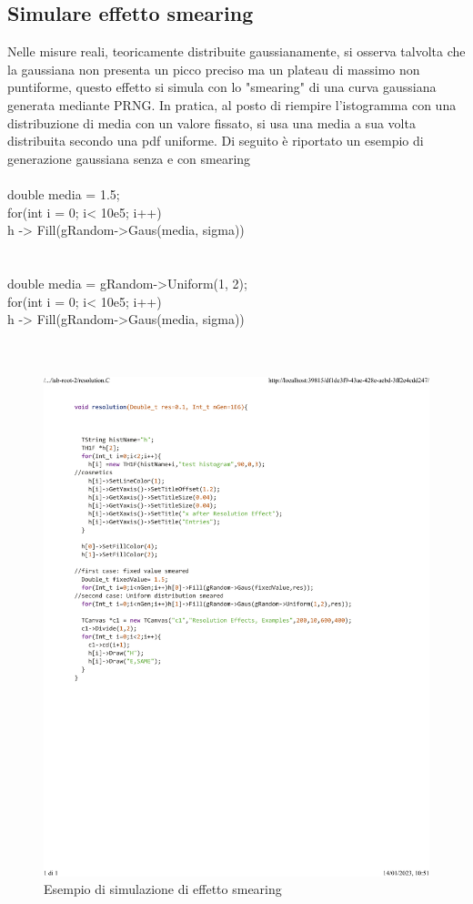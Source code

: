 \documentclass[10pt,a4paper]{article}
\begin{document}
\subsection{Simulare effetto smearing}
Nelle misure reali, teoricamente distribuite gaussianamente, si osserva talvolta che la gaussiana non presenta un picco preciso ma un plateau di massimo non puntiforme, questo effetto si simula con lo "smearing" di una curva gaussiana generata mediante PRNG. In pratica, al posto di riempire l'istogramma con una distribuzione di media con un valore fissato, si usa una media a sua volta distribuita secondo una pdf uniforme. Di seguito è riportato un esempio di generazione gaussiana senza e con smearing\\\\
double media = 1.5;\\
for(int i = 0; i< 10e5; i++){\\
	h -> Fill(gRandom->Gaus(media, sigma))\\
}\\\\
double media = gRandom->Uniform(1, 2);\\
for(int i = 0; i< 10e5; i++){\\
	h -> Fill(gRandom->Gaus(media, sigma))\\
}\\\\
\newpage
\begin{figure}[h!]
	\centering
	\includegraphics[width=1.\linewidth]{_..._lab-root-2_resolution.C}
	\caption{Esempio di simulazione di effetto smearing}
\end{figure}
\newpage 
\end{document}
